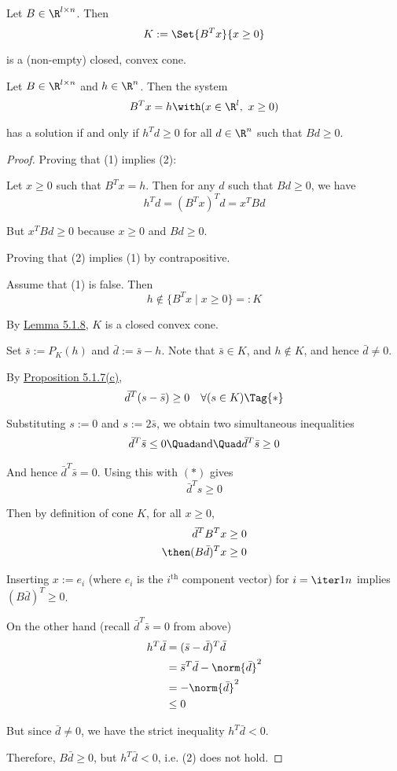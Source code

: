 Let $B\in\R^{l\times n}$. Then
$$
  K:=\Set{B^Tx}{x\geq0}
$$

is a (non-empty) closed, convex cone.

\label{d64b0db}

Let $B\in\R^{l\times n}$ and $h\in\R^n$. Then the system
$$
  B^Tx=h\with(x\in\R^l,\ x\geq0)
$$

has a solution if and only if $h^Td\geq0$ for all $d\in\R^n$ such that
$Bd\geq0$.

\begin{proof}
  Proving that (1) implies (2):

  Let $x\geq0$ such that $B^Tx=h$. Then for any $d$ such that $Bd\geq0$, we have
  $$
    h^Td=(B^Tx)^Td=x^TBd
  $$

  But $x^TBd\geq0$ because $x\geq0$ and $Bd\geq0$.

  Proving that (2) implies (1) by contrapositive.

  Assume that (1) is false. Then
  $$
    h\notin\{B^Tx \mid x\geq0\}=:K
  $$

  By \href{d2dff14}{Lemma 5.1.8}, $K$ is a closed convex cone.

  Set $\bar s:=P_K(h)$ and $\bar d:=\bar s-h$. Note that $\bar s\in K$, and
  $h\notin K$, and hence $\bar d\neq0$.

  By \href{ce30ae7}{Proposition 5.1.7(c)},
  \begin{equation*}
    \bar d^T(s-\bar s)\geq0\quad\forall(s\in K)\Tag{*}
  \end{equation*}

  Substituting $s:=0$ and $s:=2\bar s$, we obtain two simultaneous inequalities
  \begin{align*}
    \bar d^T\bar s\leq0\Quad\text{and}\Quad\bar d^T\bar s\geq0
  \end{align*}

  And hence $\bar d^T\bar s=0$. Using this with $(*)$ gives
  $$
    \bar d^Ts\geq0
  $$

  Then by definition of cone $K$, for all $x\geq0$,
  \begin{align*}
    \bar d^T B^Tx     & \geq0 \\
    \then(B\bar d)^Tx & \geq0
  \end{align*}

  Inserting $x:=e_i$ (where $e_i$ is the $i^\text{th}$ component vector) for
  $i=\iter1n$ implies $(B\bar d)^T\geq0$.

  On the other hand (recall $\bar d^T\bar s=0$ from above)
  \begin{align*}
    h^T\bar d & =(\bar s-\bar d)^T\bar d        \\
              & =\bar s^T\bar d-\norm{\bar d}^2 \\
              & =-\norm{\bar d}^2               \\
              & \leq 0
  \end{align*}

  But since $\bar d\neq0$, we have the strict inequality $h^T\bar d<0$.

  Therefore, $B\bar d\geq0$, but $h^T\bar d<0$, i.e. (2) does not hold.
\end{proof}


